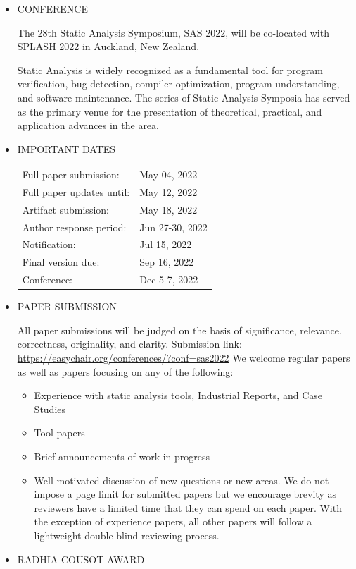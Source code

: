 \documentclass[prodmode,acmtecs]{acmsmall} %
\begin{document}
\begin{itemize}\item  CONFERENCE 
 
  The 28th Static Analysis Symposium, SAS 2022, will be co-located with SPLASH 2022 in Auckland, New Zealand. 
 
  Static Analysis is widely recognized as a fundamental tool for program verification, bug detection, compiler optimization, program understanding, and software maintenance. The series of Static Analysis Symposia has served as the primary venue for the presentation of theoretical, practical, and application advances in the area. 
 
\item  IMPORTANT DATES 
 
\begin{tabulary}{\linewidth}{LL}Full paper submission:  & May 04, 2022 \\
Full paper updates until:  & May 12, 2022 \\
Artifact submission:  & May 18, 2022 \\
Author response period:  & Jun 27-30, 2022 \\
Notification:  & Jul 15, 2022 \\
Final version due:  & Sep 16, 2022 \\
Conference:  & Dec 5-7, 2022 \\
\end{tabulary}
 
\item  PAPER SUBMISSION 
 
  All paper submissions will be judged on the basis of significance, relevance, correctness, originality, and clarity. Submission link: \href{https://easychair.org/conferences/?conf=sas2022}{https://easychair.org/conferences/?conf=sas2022} We welcome regular papers as well as papers focusing on any of the following: 
 
\begin{itemize}\item   Experience with static analysis tools, Industrial Reports, and Case Studies
\item   Tool papers
\item   Brief announcements of work in progress
\item   Well-motivated discussion of new questions or new areas. We do not impose a page limit for submitted papers but we encourage brevity as reviewers have a limited time that they can spend on each paper. With the exception of experience papers, all other papers will follow a lightweight double-blind reviewing process.
\end{itemize} 
\item  RADHIA COUSOT AWARD 
 

\end{itemize}
\end{document}

